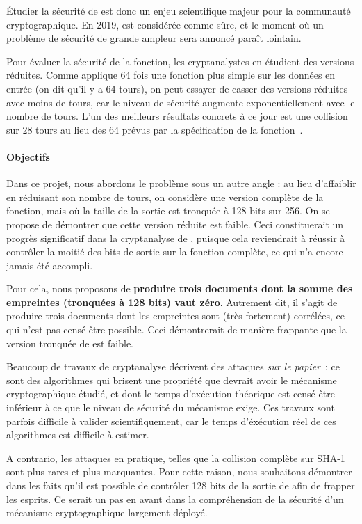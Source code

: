 \documentclass[
    a4paper, 
    12pt, onecolumn,
]{article}
\begin{document}
Étudier la sécurité de \sha est donc un enjeu scientifique majeur pour la
communauté cryptographique. En 2019, \sha est considérée comme sûre, et le
moment où un problème de sécurité de grande ampleur sera annoncé paraît
lointain.

Pour évaluer la sécurité de la fonction, les cryptanalystes en étudient des
versions réduites. Comme \sha applique 64 fois une fonction plus simple sur les
données en entrée (on dit qu'il y a 64 \og tours\fg), on peut essayer de casser
des versions réduites avec moins de tours, car le niveau de sécurité augmente
exponentiellement avec le nombre de tours. L'un des meilleurs résultats concrets
à ce jour est une collision sur 28 tours au lieu des 64 prévus par la
spécification de la fonction~\cite{MendelNS13}.

\paragraph{Objectifs} Dans ce projet, nous abordons le problème sous un autre
angle : au lieu d'affaiblir \sha en réduisant son nombre de tours, on considère
une version complète de la fonction, mais où la taille de la sortie est tronquée
à 128 bits sur 256. On se propose de démontrer que cette version réduite est
faible. Ceci constituerait un progrès significatif dans la cryptanalyse de \sha,
puisque cela reviendrait à réussir à \og contrôler\fg{} la moitié des bits de
sortie sur la fonction complète, ce qui n'a encore jamais été accompli.

Pour cela, nous proposons de \textbf{produire trois documents dont la somme des
  empreintes (tronquées à 128 bits) vaut zéro}. Autrement dit, il s'agit de
produire trois documents dont les empreintes sont (très fortement) corrélées, ce
qui n'est pas censé être possible. Ceci démontrerait de manière frappante que la
version tronquée de \sha est faible.

Beaucoup de travaux de cryptanalyse décrivent des attaques \emph{sur le
  papier}~: ce sont des algorithmes qui brisent une propriété que devrait avoir
le mécanisme cryptographique étudié, et dont le temps d'exécution théorique est
censé être inférieur à ce que le niveau de sécurité du mécanisme exige. Ces
travaux sont parfois difficile à valider scientifiquement, car le temps
d'éxécution réel de ces algorithmes est difficile à estimer.

A contrario, les attaques \og en pratique\fg{}, telles que la collision complète
sur \textsf{SHA-1} sont plus rares et plus marquantes. Pour cette raison, nous
souhaitons démontrer dans les faits qu'il est possible de contrôler 128 bits de
la sortie de \sha afin de frapper les esprits. Ce serait un pas en avant dans la
compréhension de la sécurité d'un mécanisme cryptographique largement déployé.
\end{document}
